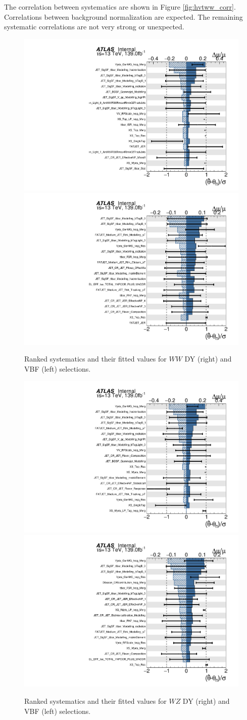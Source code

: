 The correlation between systematics are shown in Figure \ref{fig:hvtww_corr}. Correlations between background normalization are expected. The remaining systematic correlations are not very strong or unexpected.
\begin{figure}[h!]
  \centering
  \includegraphics[width=0.48\hsize]{figures/results/HVTWW/ranking_data/nov7_hvtww_2000gev/ranking.pdf}
    \includegraphics[width=0.48\hsize]{figures/results/HVTWWVBF/ranking_data/nov7_hvtwwvbf_1000gev/ranking.pdf}
 \caption{Ranked systematics and their fitted values for $WW$ DY (right) and VBF (left) selections.} 
  \label{fig:hvtww_ranking}
\end{figure} 
\FloatBarrier

\begin{figure}[h!]
  \centering
  \includegraphics[width=0.48\hsize]{figures/results/HVTWZ/ranking_data/nov7_hvtwz_1000gev/ranking.pdf}
    \includegraphics[width=0.48\hsize]{figures/results/HVTWZVBF/ranking_data/nov7_hvtwzvbf_1000gev/ranking.pdf}
 \caption{Ranked systematics and their fitted values for $WZ$ DY (right) and VBF (left) selections.} 
  \label{fig:hvtwz_ranking}
\end{figure} 
\FloatBarrier

